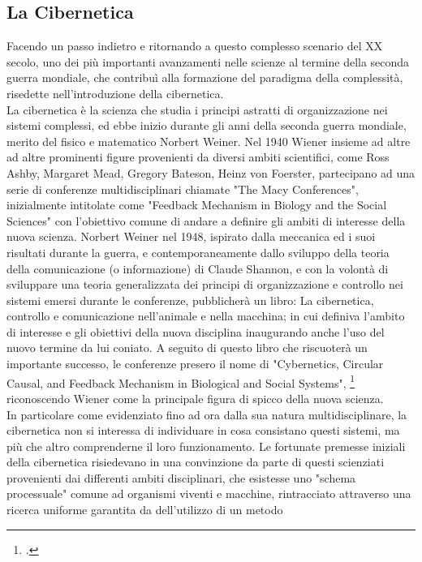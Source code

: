 \subsection{La Cibernetica}
\label{sec:La Cibernetica}
Facendo un passo indietro e ritornando a
questo complesso scenario del XX secolo,
uno dei più importanti avanzamenti nelle scienze
al termine della seconda guerra mondiale, che contribuì alla
formazione del paradigma della complessità, risedette nell'introduzione della
cibernetica. \\
La cibernetica è la scienza che studia i principi astratti di organizzazione
nei sistemi complessi, ed ebbe inizio durante gli anni della seconda guerra
mondiale, merito del fisico e matematico Norbert Weiner.
Nel 1940 Wiener insieme ad altre ad altre prominenti figure provenienti
da diversi ambiti scientifici,
come Ross Ashby, Margaret Mead, Gregory Bateson, Heinz von Foerster,
partecipano ad una serie di conferenze
multidisciplinari chiamate "The Macy Conferences", inizialmente intitolate come
"Feedback Mechanism in Biology and the Social Sciences"
con l'obiettivo comune di andare a definire
gli ambiti di interesse della nuova scienza.
Norbert Weiner nel 1948,
ispirato dalla meccanica ed i suoi risultati durante la guerra,
e contemporaneamente dallo sviluppo della teoria della comunicazione
(o informazione) di Claude Shannon,
e con la volontà di sviluppare una teoria generalizzata dei principi di
organizzazione e controllo nei sistemi emersi durante le conferenze,
pubblicherà un libro:
La cibernetica, controllo e comunicazione nell'animale e nella macchina;
in cui definiva l'ambito di interesse e gli obiettivi della nuova disciplina
inaugurando anche l'uso del nuovo termine da lui coniato.
A seguito di questo libro che riscuoterà
un importante successo, le conferenze presero il nome di
"Cybernetics, Circular Causal, and Feedback Mechanism
in Biological and Social Systems", \footcite{fabbrisgiustinianocyb}
riconoscendo Wiener come la principale figura di spicco della nuova scienza. \\
In particolare come evidenziato fino ad ora dalla sua natura multidisciplinare,
la cibernetica non si interessa di individuare in
cosa consistano questi sistemi,
ma più che altro comprenderne il loro funzionamento.
Le fortunate premesse iniziali della cibernetica risiedevano in una convinzione
da parte di questi scienziati provenienti dai differenti ambiti disciplinari,
che esistesse uno "schema processuale" comune ad organismi viventi e macchine,
rintracciato attraverso una ricerca uniforme
garantita da dell'utilizzo di un metodo
